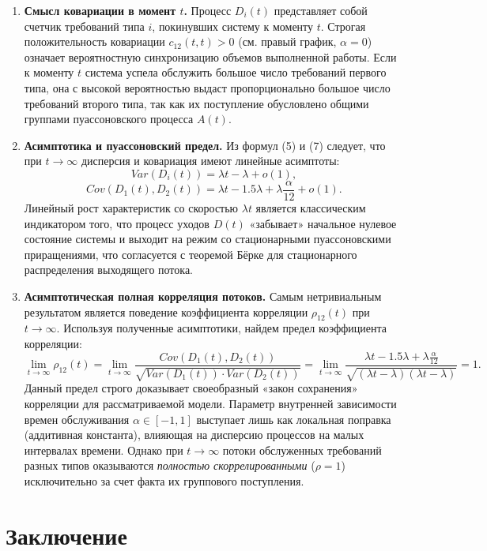 \documentclass[12pt]{article}
\theoremstyle{plain}
\theoremstyle{definition}
\theoremstyle{remark}
\begin{document}
\begin{enumerate}
    \item \textbf{Смысл ковариации в момент $t$.} Процесс $D_i(t)$ представляет собой счетчик требований типа $i$, покинувших систему к моменту $t$. Строгая положительность ковариации $c_{12}(t,t) > 0$ (см. правый график, $\alpha=0$) означает вероятностную синхронизацию объемов выполненной работы. Если к моменту $t$ система успела обслужить  большое число требований первого типа, она с высокой вероятностью выдаст пропорционально большое число требований второго типа, так как их поступление обусловлено общими группами пуассоновского процесса $A(t)$.
    
    \item \textbf{Асимптотика и пуассоновский предел.} Из формул (5) и (7) следует, что при $t \to \infty$ дисперсия и ковариация имеют линейные асимптоты:
    $$ Var(D_i(t)) = \lambda t - \lambda + o(1), $$
    $$ Cov(D_1(t), D_2(t)) = \lambda t - 1.5\lambda + \lambda \frac{\alpha}{12} + o(1). $$
    Линейный рост характеристик со скоростью $\lambda t$ является классическим индикатором того, что процесс уходов $D(t)$ «забывает» начальное нулевое состояние системы и выходит на режим со стационарными пуассоновскими приращениями, что согласуется с теоремой Бёрке \cite{burke} для стационарного распределения выходящего потока.
    
    \item \textbf{Асимптотическая полная корреляция потоков.} Самым нетривиальным результатом является поведение коэффициента корреляции $\rho_{12}(t)$ при $t \to \infty$. Используя полученные асимптотики, найдем предел коэффициента корреляции:
    $$ \lim_{t \to \infty} \rho_{12}(t) = \lim_{t \to \infty} \frac{Cov(D_1(t), D_2(t))}{\sqrt{Var(D_1(t)) \cdot Var(D_2(t))}} = \lim_{t \to \infty} \frac{\lambda t - 1.5\lambda + \lambda \frac{\alpha}{12}}{\sqrt{(\lambda t - \lambda)(\lambda t - \lambda)}} = 1. $$
    Данный предел строго доказывает своеобразный «закон сохранения» корреляции для рассматриваемой модели. Параметр внутренней зависимости времен обслуживания $\alpha \in [-1, 1]$ выступает лишь как локальная поправка (аддитивная константа), влияющая на дисперсию процессов на малых интервалах времени. Однако при $t \to \infty$ потоки обслуженных требований разных типов оказываются \textit{полностью скоррелированными} ($\rho = 1$) исключительно за счет факта их группового поступления.
\end{enumerate}

\section*{Заключение}
\end{document}
